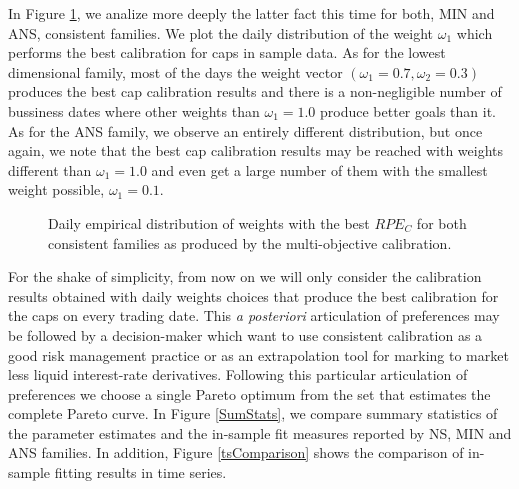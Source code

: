 In Figure \ref{tsWeights}, we analize more deeply the latter fact this
time for both, MIN and ANS, consistent families. We plot the daily
distribution of the weight $\omega_1$ which performs the best
calibration for caps in sample data. As for the lowest dimensional
family, most of the days the weight vector
$(\omega_1=0.7,\omega_2=0.3)$ produces the best cap calibration
results and there is a non-negligible number of bussiness dates where
other weights than $\omega_1=1.0$ produce better goals than it. As for
the ANS family, we observe an entirely different distribution, but
once again, we note that the best cap calibration results may be
reached with weights different than $\omega_1=1.0$ and even get a large
number of them with the smallest weight possible, $\omega_1=0.1$. 

\begin{figure}[h!]
\centering
\caption{Daily empirical distribution of weights with the best $RPE_C$
  for both consistent families as produced by the multi-objective
  calibration. \label{tsWeights}} 
\end{figure}
For the shake of simplicity, from now on we will only consider the
calibration results obtained with daily weights choices that produce
the best calibration for the caps on every trading date. This {\sl a
posteriori} articulation of preferences may be followed by a
decision-maker which want to use consistent calibration as a good risk
management practice or as an extrapolation tool for marking to market
less liquid interest-rate derivatives. Following this particular
articulation of preferences we choose a single Pareto optimum from
the set that estimates the complete Pareto curve. In Figure
\ref{SumStats}, we compare summary statistics of the parameter
estimates and the in-sample fit measures reported by NS, MIN and ANS
families. In addition, Figure \ref{tsComparison} shows the comparison
of in-sample fitting results in time series. 

